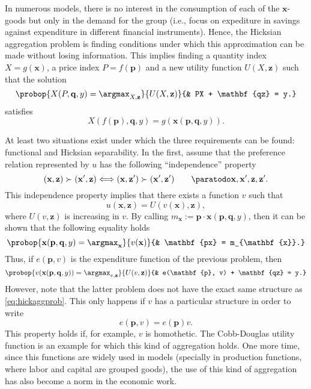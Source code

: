 \documentclass[english, a4paper,12pt]{article}
\begin{document}
In numerous models, there is no interest in the consumption of each of the $\mathbf{x}$-goods but only in the demand for the group (i.e., focus on expediture in savings against expenditure in different financial instruments). Hence, the Hicksian aggregation problem is finding conditions under which this approximation can be made without losing information. This implies finding a quantity index $X = g(\mathbf{x})$, a price index $P = f(\mathbf{p})$ and a new utility function $U(X, \mathbf{z})$ such that the solution 
	 \begin{equation} \label{eq:hickaggprob}
		\probop{X(P, \mathbf{q}, y) = \argmax_{X, \mathbf{z}}}{U(X, \mathbf{z})}
					{&	PX + \mathbf{qz} = y.}
	\end{equation}
satisfies
	$$X(f(\mathbf{p}), \mathbf{q}, y) = g(\mathbf{x}(\mathbf{p}, \mathbf{q}, y)).$$

At least two situations exist under which the three requirements can be found: functional and Hicksian separability. In the first, assume that the preference relation represented by $u$ has the following ``independence'' property
	$$(\mathbf{x}, \mathbf{z}) \succ (\mathbf{x}', \mathbf{z}) 
		\Longleftrightarrow (\mathbf{x}, \mathbf{z}') \succ (\mathbf{x}', \mathbf{z}') \qquad \paratodo \mathbf{x}, \mathbf{x}', \mathbf{z}, \mathbf{z}'.$$
This independence property implies that there exists a function $v$ such that
	$$u(\mathbf{x}, \mathbf{z}) = U(v(\mathbf{x}), \mathbf{z}),$$
where $U(v,\mathbf{z})$ is increasing in $v$. By calling $m_{\mathbf{x}} := \mathbf{p}\cdot \mathbf{x}(\mathbf{p}, \mathbf{q}, y)$, then it can be shown that the following equality holds
	$$\probop{\mathbf{x}(\mathbf{p}, \mathbf{q}, y) = \argmax_{\mathbf{x}}}{v(\mathbf{x})}
					{&	\mathbf{px} = m_{\mathbf{x}}.}$$
Thus, if $e(\mathbf{p}, v)$ is the expenditure function of the previous problem, then
	$$	\probop{v(\mathbf{x}(\mathbf{p}, \mathbf{q}, y)) = \argmax_{v, \mathbf{z}}}{U(v, \mathbf{z})}
				{&	e(\mathbf{p}, v) + \mathbf{qz} = y.}
	$$
However, note that the latter problem does not have the exact same structure as \eqref{eq:hickaggprob}. This only happens if $v$ has a particular structure in order to write
	$$e(\mathbf{p}, v) = e(\mathbf{p})v.$$
This property holds if, for example, $v$ is homothetic. The Cobb-Douglas utility function is an example for which this kind of aggregation holds. One more time, since this functions are widely used in models (specially in production functions, where labor and capital are grouped goods), the use of this kind of aggregation has also become a norm in the economic work. 
\end{document}
